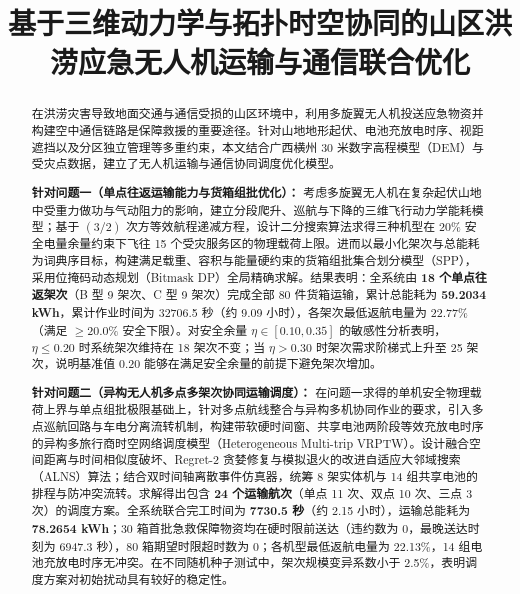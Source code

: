 \documentclass[withoutpreface,bwprint]{cumcmthesis} %
\title{基于三维动力学与拓扑时空协同的山区洪涝应急无人机运输与通信联合优化}
\begin{document}
\maketitle

\begin{abstract}
在洪涝灾害导致地面交通与通信受损的山区环境中，利用多旋翼无人机投送应急物资并构建空中通信链路是保障救援的重要途径。针对山地地形起伏、电池充放电时序、视距遮挡以及分区独立管理等多重约束，本文结合广西横州 30 米数字高程模型（DEM）与受灾点数据，建立了无人机运输与通信协同调度优化模型。

\textbf{针对问题一（单点往返运输能力与货箱组批优化）：} 考虑多旋翼无人机在复杂起伏山地中受重力做功与气动阻力的影响，建立分段爬升、巡航与下降的三维飞行动力学能耗模型；基于 $(3/2)$ 次方等效航程递减方程，设计二分搜索算法求得三种机型在 20\% 安全电量余量约束下飞往 15 个受灾服务区的物理载荷上限。进而以最小化架次与总能耗为词典序目标，构建满足载重、容积与能量硬约束的货箱组批集合划分模型（SPP），采用位掩码动态规划（Bitmask DP）全局精确求解。结果表明：全系统由 \textbf{18 个单点往返架次}（B 型 9 架次、C 型 9 架次）完成全部 80 件货箱运输，累计总能耗为 \textbf{59.2034 kWh}，累计作业时间为 32706.5 秒（约 9.09 小时），各架次最低返航电量为 22.77\%（满足 $\ge 20.0\%$ 安全下限）。对安全余量 $\eta \in [0.10, 0.35]$ 的敏感性分析表明，$\eta \le 0.20$ 时系统架次维持在 18 架次不变；当 $\eta > 0.30$ 时架次需求阶梯式上升至 25 架次，说明基准值 0.20 能够在满足安全余量的前提下避免架次增加。

\textbf{针对问题二（异构无人机多点多架次协同运输调度）：} 在问题一求得的单机安全物理载荷上界与单点组批极限基础上，针对多点航线整合与异构多机协同作业的要求，引入多点巡航回路与车电分离流转机制，构建带软硬时间窗、共享电池两阶段等效充放电时序的异构多旅行商时空网络调度模型（Heterogeneous Multi-trip VRPTW）。设计融合空间距离与时间相似度破坏、Regret-2 贪婪修复与模拟退火的改进自适应大邻域搜索（ALNS）算法；结合双时间轴离散事件仿真器，统筹 8 架实体机与 14 组共享电池的排程与防冲突流转。求解得出包含 \textbf{24 个运输航次}（单点 11 次、双点 10 次、三点 3 次）的调度方案。全系统联合完工时间为 \textbf{7730.5 秒}（约 2.15 小时），运输总能耗为 \textbf{78.2654 kWh}；30 箱首批急救保障物资均在硬时限前送达（违约数为 0，最晚送达时刻为 6947.3 秒），80 箱期望时限超时数为 0；各机型最低返航电量为 22.13\%，14 组电池充放电时序无冲突。在不同随机种子测试中，架次规模变异系数小于 2.5\%，表明调度方案对初始扰动具有较好的稳定性。


\end{abstract}
\end{document}
